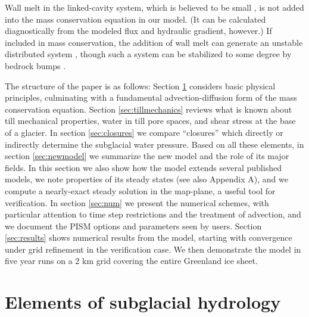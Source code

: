 \documentclass[gmd]{copernicus}   %
\begin{document}
Wall melt in the linked-cavity system, which is believed to be small \citep{Kamb1987}, is not added into the mass conservation equation in our model.  (It can be calculated diagnostically from the modeled flux and hydraulic gradient, however.)  If included in mass conservation, the addition of wall melt can generate an unstable distributed system \citep{Walder1982}, though such a system can be stabilized to some degree by bedrock bumps \citep{CreytsSchoof2009}.

The structure of the paper is as follows: Section \ref{sec:elements} considers basic physical principles, culminating with a fundamental advection-diffusion form of the mass conservation equation.  Section \ref{sec:tillmechanics} reviews what is known about till mechanical properties, water in till pore spaces, and shear stress at the base of a glacier.  In section \ref{sec:closures} we compare ``closures'' which directly or indirectly determine the subglacial water pressure.  Based on all these elements, in section \ref{sec:newmodel} we summarize the new model and the role of its major fields.  In this section we also show how the model extends several published models, we note properties of its steady states (see also Appendix A), and we compute a nearly-exact steady solution in the map-plane, a useful tool for verification.  In section \ref{sec:num} we present the numerical schemes, with particular attention to time step restrictions and the treatment of advection, and we document the PISM options and parameters seen by users.  Section \ref{sec:results} shows numerical results from the model, starting with convergence under grid refinement in the verification case.  We then demonstrate the model in five year runs on a 2 km grid covering the entire Greenland ice sheet.


\section{Elements of subglacial hydrology} \label{sec:elements}
\end{document}
